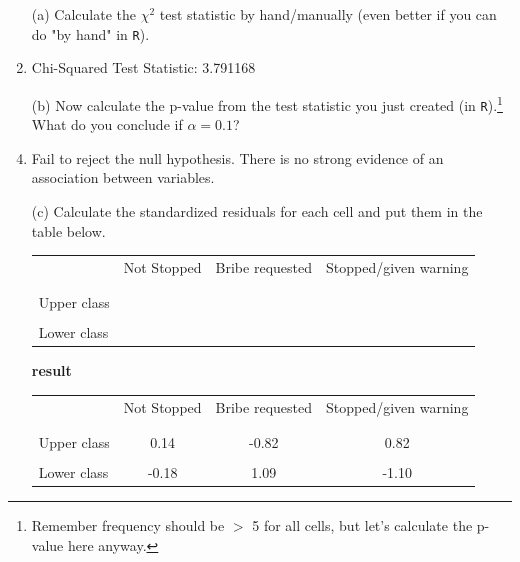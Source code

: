 \documentclass[12pt,letterpaper]{article}
\begin{document}
\begin{enumerate}
	
	\item [(a)]
	Calculate the $\chi^2$ test statistic by hand/manually (even better if you can do "by hand" in \texttt{R}).\\
			 
			\item Chi-Squared Test Statistic:  3.791168
	\vspace{7cm}
	\item [(b)]
	Now calculate the p-value from the test statistic you just created (in \texttt{R}).\footnote{Remember frequency should be $>$ 5 for all cells, but let's calculate the p-value here anyway.}  What do you conclude if $\alpha = 0.1$?\\
		 
		\item Fail to reject the null hypothesis. There is no strong evidence of an association between variables.
	\newpage
	\item [(c)] Calculate the standardized residuals for each cell and put them in the table below.
	\vspace{1cm}
	
	\begin{table}[h]
		\centering
		\begin{tabular}{l | c c c }
			& Not Stopped & Bribe requested & Stopped/given warning \\
			\\[-1.8ex] 
			\hline \\[-1.8ex]
			Upper class  &  &  &  \\
			\\
			Lower class &  &   &   \\
			
		\end{tabular}
	\end{table}
		 
		\begin{table}[h]
			\centering
			\begin{center}
			\textbf{{\large result}}
			\end{center}
			\begin{tabular}{l | c c c }
				& Not Stopped & Bribe requested & Stopped/given warning \\
				\\[-1.8ex] 
				\hline \\[-1.8ex]
				Upper class & 0.14 & -0.82 & 0.82 \\
				\\
				Lower class & -0.18 & 1.09  & -1.10  \\
				

\end{tabular}
\end{table}
\end{enumerate}
\end{document}
